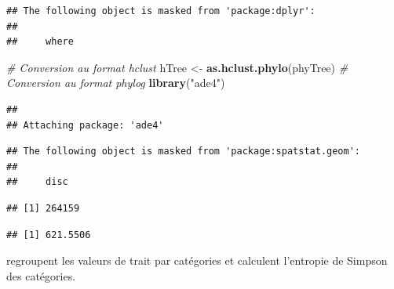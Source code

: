 \documentclass[
  11pt,
  french,
  a4paper,
  extrafontsizes,onecolumn,openright
  ]{memoir}
\newenvironment{Shaded}{\begin{snugshade}}{\end{snugshade}}
\newcommand{\CommentTok}[1]{\textcolor[rgb]{0.56,0.35,0.01}{\textit{#1}}}
\newcommand{\DecValTok}[1]{\textcolor[rgb]{0.00,0.00,0.81}{#1}}
\newcommand{\FunctionTok}[1]{\textcolor[rgb]{0.13,0.29,0.53}{\textbf{#1}}}
\newcommand{\NormalTok}[1]{#1}
\newcommand{\OtherTok}[1]{\textcolor[rgb]{0.56,0.35,0.01}{#1}}
\newcommand{\SpecialCharTok}[1]{\textcolor[rgb]{0.81,0.36,0.00}{\textbf{#1}}}
\newcommand{\StringTok}[1]{\textcolor[rgb]{0.31,0.60,0.02}{#1}}
\begin{document}
\begin{verbatim}
## The following object is masked from 'package:dplyr':
## 
##     where
\end{verbatim}

\begin{Shaded}
\begin{Highlighting}[]
\CommentTok{\# Conversion au format hclust}
\NormalTok{hTree }\OtherTok{\textless{}{-}} \FunctionTok{as.hclust.phylo}\NormalTok{(phyTree)}
\CommentTok{\# Conversion au format phylog}
\FunctionTok{library}\NormalTok{(}\StringTok{"ade4"}\NormalTok{)}
\end{Highlighting}
\end{Shaded}

\begin{verbatim}
## 
## Attaching package: 'ade4'
\end{verbatim}

\begin{verbatim}
## The following object is masked from 'package:spatstat.geom':
## 
##     disc
\end{verbatim}

\begin{Shaded}
\end{Shaded}

\begin{verbatim}
## [1] 264159
\end{verbatim}

\begin{Shaded}
\end{Shaded}

\begin{verbatim}
## [1] 621.5506
\end{verbatim}

\normalsize

\textcite{Kader2007} regroupent les valeurs de trait par catégories et calculent l'entropie de Simpson des catégories.
\end{document}
